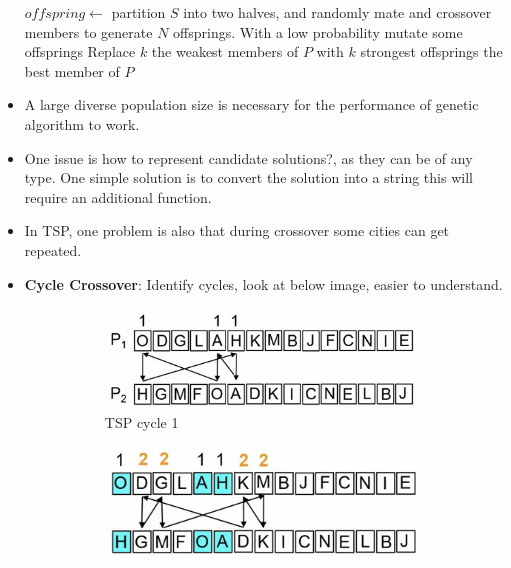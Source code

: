 \documentclass[a4paper]{article}
\begin{document}
\begin{itemize}
\begin{algorithm}[H]
\begin{algorithmic}[1]
                \State $offspring\gets$ partition $S$ into two halves, and randomly mate and crossover members to generate $N$ offsprings.
                \State With a low probability mutate some offsprings
                \State Replace $k$ the weakest members of $P$ with $k$ strongest offsprings
            \State \Return the best member of $P$
        \end{algorithmic}
    \end{algorithm}
    \item A large diverse population size is necessary for the performance of genetic algorithm to work.
    \item One issue is how to represent candidate solutions?, as they can be of any type. One simple solution is to convert the solution into a string this will require an additional function.
    \item In TSP, one problem is also that during crossover some cities can get repeated.
    \item \textbf{Cycle Crossover}: Identify cycles, look at below image, easier to understand.
    \begin{figure}[H]
        \centering
        \begin{subfigure}[b]{0.45\textwidth}
            \centering
            \includegraphics[width=\textwidth]{Degree//static/AI_TSP_ga_cycle1.png}
            \caption{TSP cycle 1}
        \end{subfigure}
        \hfill
        \begin{subfigure}[b]{0.45\textwidth}
            \centering
            \includegraphics[width=\textwidth]{Degree//static/AI_TSP_ga_cycle2.png}

\end{subfigure}
\end{figure}
\end{itemize}
\end{document}
